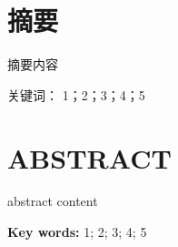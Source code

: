 \newpage
\chapter*{摘要}


摘要内容

\vspace{\baselineskip}
\noindent
{\heiti {} 关键词：}
{\songti {} 1；2；3；4；5}

\newpage
\chapter*{ABSTRACT}
abstract content

\vspace{\baselineskip}
\noindent
{\heiti {} \textbf{Key words:} }
{\songti {} 1; 2; 3; 4; 5}